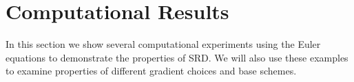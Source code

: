 \section{Computational Results}\label{sec:compResults}
In this section we show several computational experiments using the Euler
equations to demonstrate the properties of SRD. We will also use these
examples to examine 
properties of different gradient choices and base schemes. 

%
